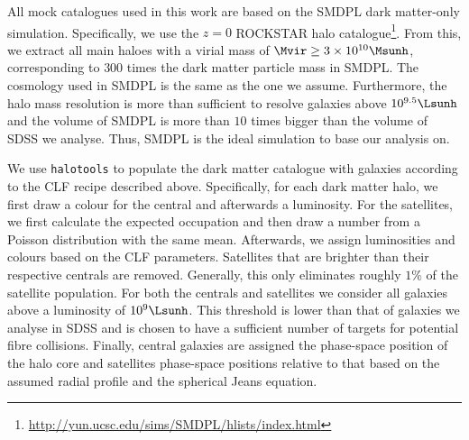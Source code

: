 \documentclass[fleqn,usenatbib,useAMS]{mnras}
\begin{document}
All mock catalogues used in this work are based on the SMDPL dark matter-only simulation. Specifically, we use the $z = 0$ ROCKSTAR \citep{Behroozi+13} halo catalogue\footnote{\url{http://yun.ucsc.edu/sims/SMDPL/hlists/index.html}}. From this, we extract all main haloes with a virial mass of $\Mvir \geq 3 \times 10^{10} \Msunh$, corresponding to $300$ times the dark matter particle mass in SMDPL. The cosmology used in SMDPL is the same as the one we assume. Furthermore, the halo mass resolution is more than sufficient to resolve galaxies above $10^{9.5} \Lsunh$ \citep[compare e.g.][]{Guo+15b, Sinha+17} and the volume of SMDPL is more than $10$ times bigger than the volume of SDSS we analyse. Thus, SMDPL is the ideal simulation to base our analysis on.

We use \texttt{halotools} to populate the dark matter catalogue with galaxies according to the CLF recipe described above. Specifically, for each dark matter halo, we first draw a colour for the central and afterwards a luminosity. For the satellites, we first calculate the expected occupation and then draw a number from a Poisson distribution with the same mean. Afterwards, we assign luminosities and colours based on the CLF parameters. Satellites that are brighter than their respective centrals are removed. Generally, this only eliminates roughly $1\%$ of the satellite population. For both the centrals and satellites we consider all galaxies above a luminosity of $10^9 \Lsunh$. This threshold is lower than that of galaxies we analyse in SDSS and is chosen to have a sufficient number of targets for potential fibre collisions. Finally, central galaxies are assigned the phase-space position of the halo core and satellites phase-space positions relative to that based on the assumed radial profile and the spherical Jeans equation.
\end{document}
